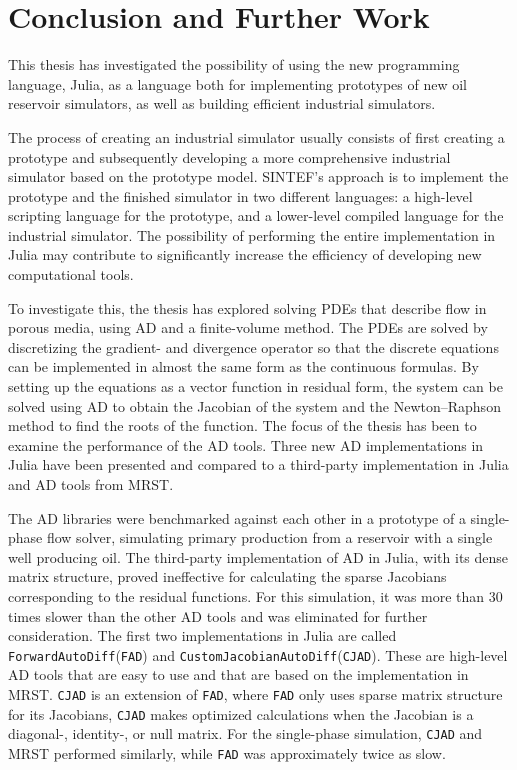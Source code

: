 \chapter{Conclusion and Further Work}
\label{ch:Conclusion}
This thesis has investigated the possibility of using the new programming language, Julia, as a language both for implementing prototypes of new oil reservoir simulators, as well as building efficient industrial simulators. 

The process of creating an industrial simulator usually consists of first creating a prototype and subsequently developing a more comprehensive industrial simulator based on the prototype model. SINTEF's approach is to implement the prototype and the finished simulator in two different languages: a high-level scripting language for the prototype, and a lower-level compiled language for the industrial simulator. The possibility of performing the entire implementation in Julia may contribute to significantly increase the efficiency of developing new computational tools.

To investigate this, the thesis has explored solving PDEs that describe flow in porous media, using AD and a finite-volume method. The PDEs are solved by discretizing the gradient- and divergence operator so that the discrete equations can be implemented in almost the same form as the continuous formulas. By setting up the equations as a vector function in residual form, the system can be solved using AD to obtain the Jacobian of the system and the Newton--Raphson method to find the roots of the function. The focus of the thesis has been to examine the performance of the AD tools. Three new AD implementations in Julia have been presented and compared to a third-party implementation in Julia and AD tools from MRST. 

The AD libraries were benchmarked against each other in a prototype of a single-phase flow solver, simulating primary production from a reservoir with a single well producing oil. The third-party implementation of AD in Julia, with its dense matrix structure, proved ineffective for calculating the sparse Jacobians corresponding to the residual functions. For this simulation, it was more than 30 times slower than the other AD tools and was eliminated for further consideration. The first two implementations in Julia are called \texttt{ForwardAutoDiff}(\texttt{FAD}) and \texttt{CustomJacobianAutoDiff}(\texttt{CJAD}). These are high-level AD tools that are easy to use and that are based on the implementation in MRST. \texttt{CJAD} is an extension of \texttt{FAD}, where \texttt{FAD} only uses sparse matrix structure for its Jacobians, \texttt{CJAD} makes optimized calculations when the Jacobian is a diagonal-, identity-, or null matrix. For the single-phase simulation, \texttt{CJAD} and MRST performed similarly, while \texttt{FAD} was approximately twice as slow. 

